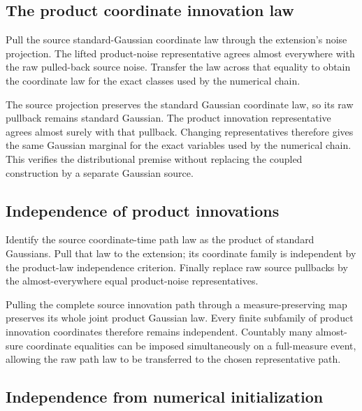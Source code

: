 \documentclass[11pt,a4paper]{report}
\begin{document}
\subsection{\texorpdfstring{The product coordinate innovation law}{The product coordinate innovation law}}
\label{report-step-UnadjustedLangevin-ProductBrownian-lean-14}


Pull the source standard-Gaussian coordinate law through the extension's noise projection. The lifted product-noise representative agrees almost everywhere with the raw pulled-back source noise. Transfer the law across that equality to obtain the coordinate law for the exact classes used by the numerical chain.



The source projection preserves the standard Gaussian coordinate law, so its raw pullback remains standard Gaussian. The product innovation representative agrees almost surely with that pullback. Changing representatives therefore gives the same Gaussian marginal for the exact variables used by the numerical chain. This verifies the distributional premise without replacing the coupled construction by a separate Gaussian source.

\subsection{\texorpdfstring{Independence of product innovations}{Independence of product innovations}}
\label{report-step-UnadjustedLangevin-ProductBrownian-lean-15}


Identify the source coordinate-time path law as the product of standard Gaussians. Pull that law to the extension; its coordinate family is independent by the product-law independence criterion. Finally replace raw source pullbacks by the almost-everywhere equal product-noise representatives.



Pulling the complete source innovation path through a measure-preserving map preserves its whole joint product Gaussian law. Every finite subfamily of product innovation coordinates therefore remains independent. Countably many almost-sure coordinate equalities can be imposed simultaneously on a full-measure event, allowing the raw path law to be transferred to the chosen representative path.

\subsection{\texorpdfstring{Independence from numerical initialization}{Independence from numerical initialization}}
\label{report-step-UnadjustedLangevin-ProductBrownian-lean-16}
\end{document}
